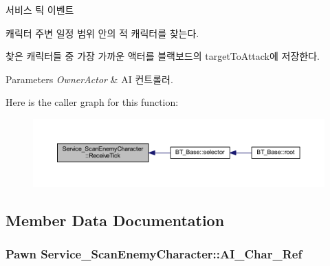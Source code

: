 서비스 틱 이벤트 

캐릭터 주변 일정 범위 안의 적 캐릭터를 찾는다.

찾은 캐릭터들 중 가장 가까운 액터를 블랙보드의 target\+To\+Attack에 저장한다. 
\begin{DoxyParams}{Parameters}
{\em Owner\+Actor} & AI 컨트롤러. \\
\hline
\end{DoxyParams}


Here is the caller graph for this function\+:
\nopagebreak
\begin{figure}[H]
\begin{center}
\leavevmode
\includegraphics[width=350pt]{class_service___scan_enemy_character_a66151b657f1393da679331e72c10336f_icgraph}
\end{center}
\end{figure}




\subsection{Member Data Documentation}
\subsubsection[{\texorpdfstring{A\+I\+\_\+\+Char\+\_\+\+Ref}{AI_Char_Ref}}]{\setlength{\rightskip}{0pt plus 5cm}Pawn Service\+\_\+\+Scan\+Enemy\+Character\+::\+A\+I\+\_\+\+Char\+\_\+\+Ref\hspace{0.3cm}{\ttfamily [private]}}\hypertarget{class_service___scan_enemy_character_a74d7b226cb90283b97be427527df818c}{}\label{class_service___scan_enemy_character_a74d7b226cb90283b97be427527df818c}
